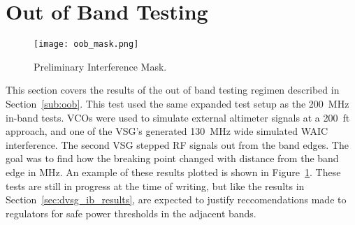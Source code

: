 \section{Out of Band Testing}\label{sec:dvsg_oob_results}
 \begin{figure}[h!]
	\centering
	\texttt{[image: oob\_mask.png]}
	\caption{Preliminary Interference Mask.}
	\label{fig:oob_mask}
\end{figure}

This section covers the results of the out of band testing regimen described in Section~\ref{sub:oob}. This test used the same expanded test setup as the 200~MHz in-band tests. VCOs were used to simulate external altimeter signals at a 200~ft approach, and one of the VSG's generated 130~MHz wide simulated WAIC interference. The second VSG stepped RF signals out from the band edges. The goal was to find how the breaking point changed with distance from the band edge in MHz. An example of these results plotted is shown in Figure~\ref{fig:oob_mask}. These tests are still in progress at the time of writing, but like the results in Section~\ref{sec:dvsg_ib_results}, are expected to justify reccomendations made to regulators for safe power thresholds in the adjacent bands. 

